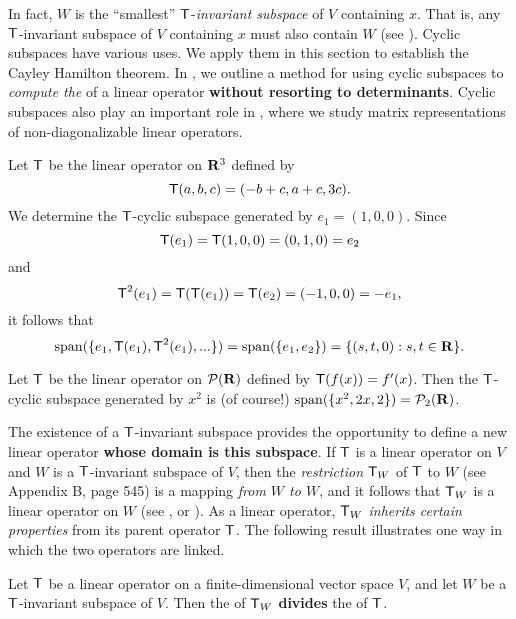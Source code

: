 \begin{remark} \label{remark 5.4.1}
In fact, \(W\) is the ``smallest'' \(\textsf{T}\)-\emph{invariant subspace} of \(V\) containing \(x\).
That is, any \(\textsf{T}\)-invariant subspace of \(V\) containing \(x\) must also contain \(W\) (see ).
Cyclic subspaces have various uses.
We apply them in this section to establish the Cayley Hamilton theorem.
In , we outline a method for using cyclic subspaces to \emph{compute the \CPOLY{}} of a linear operator \textbf{without resorting to determinants}.
Cyclic subspaces also play an important role in , where we study matrix representations of non-diagonalizable linear operators.
\end{remark}

\begin{example} \label{example 5.4.3}
Let \(\textsf{T}\) be the linear operator on \(\mathbf{R}^3\) defined by
\[
    \textsf{T}(a, b, c) = (-b + c, a + c, 3c).
\]
We determine the \(\textsf{T}\)-cyclic subspace generated by \(e_1 = (1, 0, 0)\).
Since
\[
    \textsf{T}(e_1) = \textsf{T}(1, 0, 0) = (0, 1, 0) = e_2
\]
and
\[
    \textsf{T}^2(e_1) = \textsf{T}(\textsf{T}(e_1)) = \textsf{T}(e_2) = (-1, 0, 0) = -e_1,
\]
it follows that
\[
    \operatorname{span}(\{ e_1, \textsf{T}(e_1), \textsf{T}^2(e_1), ... \}) = \operatorname{span}(\{ e_1, e_2 \}) = \{ (s, t, 0) : s, t \in \mathbf{R} \}.
\]
\end{example}

\begin{example} \label{example 5.4.4}
Let \(\textsf{T}\) be the linear operator on \(\mathcal{P}(\mathbf{R})\) defined by \(\textsf{T}(f(x)) = f'(x)\).
Then the \(\textsf{T}\)-cyclic subspace generated by \(x^2\) is (of course!) \(\operatorname{span}(\{ x^2, 2x, 2 \}) = \mathcal{P}_2(\mathbf{R})\).
\end{example}

\begin{remark} \label{remark 5.4.2}
The existence of a \(\textsf{T}\)-invariant subspace provides the opportunity to define a new linear operator \textbf{whose domain is this subspace}.
If \(\textsf{T}\) is a linear operator on \(V\) and \(W\) is a \(\textsf{T}\)-invariant subspace of \(V\), then the \emph{restriction} \(\textsf{T}_W\) of \(\textsf{T}\) to \(W\) (see Appendix B, page 545) is a mapping \emph{from \(W\) to \(W\)}, and it follows that \(\textsf{T}_W\) is a linear operator on \(W\) (see , or ).
As a linear operator, \(\textsf{T}_W\) \emph{inherits certain properties} from its parent operator \(\textsf{T}\).
The following result illustrates one way in which the two operators are linked.
\end{remark}

\begin{theorem} \label{thm 5.20}
Let \(\textsf{T}\) be a linear operator on a finite-dimensional vector space \(V\), and let \(W\) be a \(\textsf{T}\)-invariant subspace of \(V\).
Then the \CPOLY{} of \(\textsf{T}_W\) \textbf{divides} the \CPOLY{} of \(\textsf{T}\).
\end{theorem}


